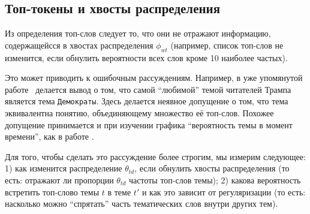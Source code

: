 \subsection{Топ-токены и хвосты распределения}


Из определения топ-слов следует то, что они не отражают информацию, содержащейсся в хвостах распределения $\phi_{wt}$ (например, список топ-слов не изменится, если обнулить вероятности всех слов кроме 10 наиболее частых).

Это может приводить к ошибочным рассуждениям. Например, в уже упомянутой работе~\cite{wang2016catching} делается вывод о том, что самой ``любимой'' темой читателей Трампа является тема \texttt{Демократы}. Здесь делается неявное допущение о том, что тема эквивалентна понятию, объединяющему множество её топ-слов. Похожее допущение принимается и при изучении графика ``вероятность темы в момент времени'', как в работе \cite{monsters_men, dispatch}.

Для того, чтобы сделать это рассуждение более строгим, мы измерим следующее: 1) как изменится распределение $\theta_{td}$, если обнулить хвосты распределения (то есть: отражают ли пропорции $\theta_{td}$ частоты топ-слов темы); 2) какова вероятность встретить топ-слово темы $t$ в теме $t'$ и как это зависит от регуляризации (то есть: насколько можно ``спрятать'' часть тематических слов внутри других тем).






